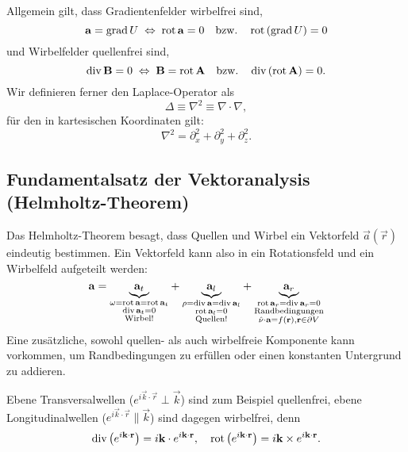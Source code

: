 Allgemein gilt, dass Gradientenfelder wirbelfrei sind,
\begin{equation*}
	\mathbf{a}=\operatorname{grad} U\;\Leftrightarrow\; \operatorname{rot} \mathbf{a}=0\quad\mathrm{bzw.}\quad  \operatorname{rot} \left(\operatorname{grad} U\right)=0
\end{equation*}
und Wirbelfelder quellenfrei sind,
\begin{equation*}
	\operatorname{div} \mathbf{B}=0\;\Leftrightarrow\; \mathbf{B}=\operatorname{rot} \mathbf{A}\quad\mathrm{bzw.}\quad  \operatorname{div} \left(\operatorname{rot} \mathbf{A}\right)=0.
\end{equation*}
Wir definieren ferner den Laplace-Operator als
\begin{equation*}
	\Delta  \equiv \nabla ^{2}\equiv \nabla \cdot \nabla ,
\end{equation*}
für den in kartesischen Koordinaten gilt:
\begin{equation*}
	\nabla ^{2}=\partial _{x}^{2}+\partial _{y}^{2}+\partial _{z}^{2}.
\end{equation*}
\subsection{Fundamentalsatz der Vektoranalysis (Helmholtz-Theorem)\label{ref-009}}

Das Helmholtz-Theorem besagt, dass Quellen und Wirbel ein Vektorfeld $\vec {a}\left(\vec {r}\right)$ eindeutig bestimmen. Ein Vektorfeld kann also in ein Rotationsfeld und ein Wirbelfeld aufgeteilt werden:
\begin{equation*}
	\mathbf{a}=\underset{\substack{
			\omega =\operatorname{rot} \mathbf{a}=\operatorname{rot} \mathbf{a}_{t} \\
			\operatorname{div} \mathbf{a}_{t}=0 \\
			\text{Wirbel}!
		}}{\underbrace{\mathbf{a}_{t}}}+\underset{\substack{
			\rho =\operatorname{div} \mathbf{a}=\operatorname{div} \mathbf{a}_{l} \\
			\operatorname{rot} \mathbf{a}_{l}=0                     \\
			\text{Quellen}!
		}}{\underbrace{\mathbf{a}_{l}}}+\underset{\substack{
			\operatorname{rot} \mathbf{a}_{r}=\operatorname{div} \mathbf{a}_{r}=0 \\
			\text{Randbedingungen}                 \\
			\hat{\mathbf{\nu }}\cdot \mathbf{a}=f\left(\mathbf{r}\right),\mathbf{r}\in \partial V
		}}{\underbrace{\mathbf{a}_{r}}}
\end{equation*}
Eine zusätzliche, sowohl quellen- als auch wirbelfreie Komponente kann vorkommen, um Randbedingungen zu erfüllen oder einen konstanten Untergrund zu addieren.

Ebene Transversalwellen ($e^{i\vec {k}\cdot \vec {r}}\perp \vec {k}$) sind zum Beispiel quellenfrei, ebene Longitudinalwellen ($e^{i\vec {k}\cdot \vec {r}}\parallel \vec {k}$) sind dagegen wirbelfrei, denn
\begin{equation*}
	\operatorname{div} \left(e^{i\mathbf{k}\cdot \mathbf{r}}\right)=i\mathbf{k}\cdot e^{i\mathbf{k}\cdot \mathbf{r}},\quad \operatorname{rot} \left(e^{i\mathbf{k}\cdot \mathbf{r}}\right)=i\mathbf{k}\times e^{i\mathbf{k}\cdot \mathbf{r}}.
\end{equation*}




